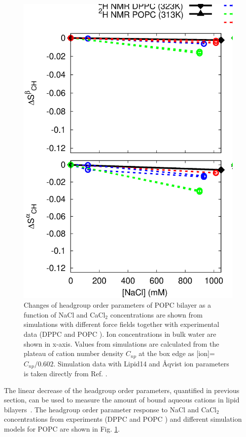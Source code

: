 \documentclass[aip,jcp,twocolumn]{revtex4}
\begin{document}
\begin{figure}[tbp]
  \centering
  \includegraphics[width=16.0cm]{../Fig/OrdParChanges_NaCl_CaCl2.eps}
  \caption{\label{OrderParameterCHANGESnewMODELS}
    Changes of headgroup order parameters of POPC bilayer as a function of NaCl and CaCl$_2$ concentrations
    are shown from simulations with different force fields together with experimental data 
    (DPPC \cite{akutsu81} and POPC \cite{altenbach84}). 
    Ion concentrations in bulk water are shown in x-axis. 
    Values from simulations are calculated from the plateau of cation number density $C_{np}$
    at the box edge as [ion]=$C_{np}/0.602$.
    Simulation data with Lipid14 and \AA{}qvist ion parameters is taken directly from Ref. \cite{catte16}.
  }
\end{figure}

The linear decrease of the headgroup order parameters, quantified in previous 
section, can be used to measure the amount of bound aqueous cations in lipid 
bilayers~\cite{seelig87,catte16}. The headgroup order parameter response 
to NaCl and CaCl$_2$ concentrations from experiments (DPPC \cite{akutsu81} 
and POPC \cite{altenbach84}) and different simulation models for POPC
are shown in Fig. \ref{OrderParameterCHANGESnewMODELS}.
\end{document}
